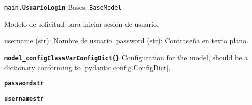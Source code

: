 \documentclass[a4paper,11pt,spanish]{sphinxmanual}
\newcommand{\robotoMonoBold}{\fontseries{b}\selectfont\ttfamily}
\renewcommand{\sphinxcode}[1]{\textcolor{sphinxorangeCode}{{\robotoMonoBold #1}}}
\renewcommand{\sphinxbfcode}[1]{\textbf{\sphinxcode{#1}}}
\renewcommand{\sphinxupquote}[1]{\texttt{#1}}
\begin{document}

\begin{fulllineitems}
\label{\detokenize{modelos:main.UsuarioLogin}}
\pysigstartsignatures
\pysiglinewithargsret
{\sphinxbfcode{\sphinxupquote{}}\sphinxcode{\sphinxupquote{main.}}\sphinxbfcode{\sphinxupquote{UsuarioLogin}}}
{\sphinxparamcomma {}\sphinxparamcomma {}}
{}
\pysigstopsignatures
\sphinxAtStartPar
Bases: \sphinxcode{\sphinxupquote{BaseModel}}

\sphinxAtStartPar
Modelo de solicitud para iniciar sesión de usuario.
\begin{description}
\sphinxAtStartPar
username (str): Nombre de usuario.
password (str): Contraseña en texto plano.

\end{description}

\begin{fulllineitems}
\label{\detokenize{modelos:main.UsuarioLogin.model_config}}
\pysigstartsignatures
\pysigline
{\sphinxbfcode{\sphinxupquote{model\_config}}\sphinxbfcode{\sphinxupquote{ClassVar\DUrole{p}{{[}}ConfigDict\DUrole{p}{{]}}}}\sphinxbfcode{\sphinxupquote{\DUrole{w}{ }\{\}}}}
\pysigstopsignatures
\sphinxAtStartPar
Configuration for the model, should be a dictionary conforming to {[}\sphinxtitleref{ConfigDict}{]}{[}pydantic.config.ConfigDict{]}.

\end{fulllineitems}


\begin{fulllineitems}
\label{\detokenize{modelos:main.UsuarioLogin.password}}
\pysigstartsignatures
\pysigline
{\sphinxbfcode{\sphinxupquote{password}}\sphinxbfcode{\sphinxupquote{str}}}
\pysigstopsignatures
\end{fulllineitems}


\begin{fulllineitems}
\label{\detokenize{modelos:main.UsuarioLogin.username}}
\pysigstartsignatures
\pysigline
{\sphinxbfcode{\sphinxupquote{username}}\sphinxbfcode{\sphinxupquote{str}}}
\pysigstopsignatures
\end{fulllineitems}


\end{fulllineitems}
\end{document}
